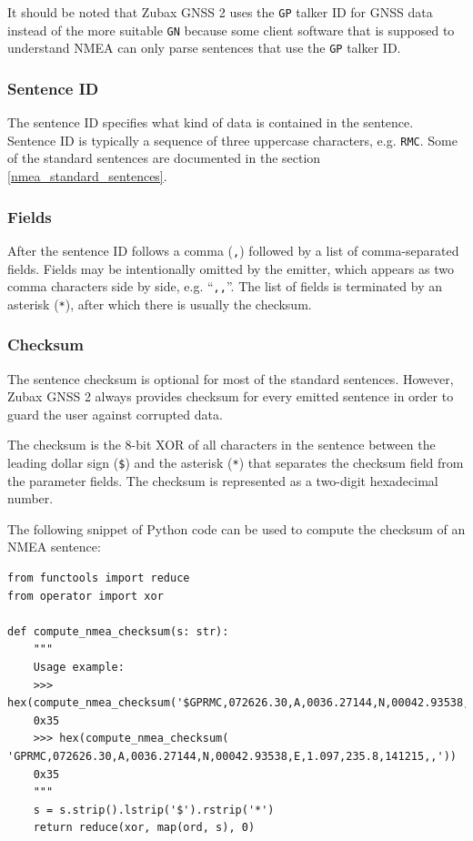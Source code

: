 \documentclass{zubaxdoc}
\begin{document}
It should be noted that Zubax GNSS 2 uses the \verb|GP| talker ID for GNSS data instead of the more
suitable \verb|GN| because some client software that is supposed to understand NMEA can only parse
sentences that use the \verb|GP| talker ID.

\subsubsection{Sentence ID}

The sentence ID specifies what kind of data is contained in the sentence.
Sentence ID is typically a sequence of three uppercase characters, e.g. \verb|RMC|.
Some of the standard sentences are documented in the section \ref{nmea_standard_sentences}.

\subsubsection{Fields}

After the sentence ID follows a comma (\verb|,|) followed by a list of comma-separated fields.
Fields may be intentionally omitted by the emitter, which appears as two comma characters
side by side, e.g. ``\verb|,,|''.
The list of fields is terminated by an asterisk (\verb|*|), after which there is usually the checksum.

\subsubsection{Checksum}

The sentence checksum is optional for most of the standard sentences.
However, Zubax GNSS 2 always provides checksum for every emitted sentence in order to guard the user against
corrupted data.

The checksum is the 8-bit XOR of all characters in the sentence between the leading dollar sign (\verb|$|) and the
asterisk (\verb|*|) that separates the checksum field from the parameter fields.
The checksum is represented as a two-digit hexadecimal number.

The following snippet of Python code can be used to compute the checksum of an NMEA sentence:

\begin{verbatim}
from functools import reduce
from operator import xor

def compute_nmea_checksum(s: str):
    """
    Usage example:
    >>> hex(compute_nmea_checksum('$GPRMC,072626.30,A,0036.27144,N,00042.93538,E,1.097,235.8,141215,,*'))
    0x35
    >>> hex(compute_nmea_checksum( 'GPRMC,072626.30,A,0036.27144,N,00042.93538,E,1.097,235.8,141215,,'))
    0x35
    """
    s = s.strip().lstrip('$').rstrip('*')
    return reduce(xor, map(ord, s), 0)
\end{verbatim}
\end{document}
